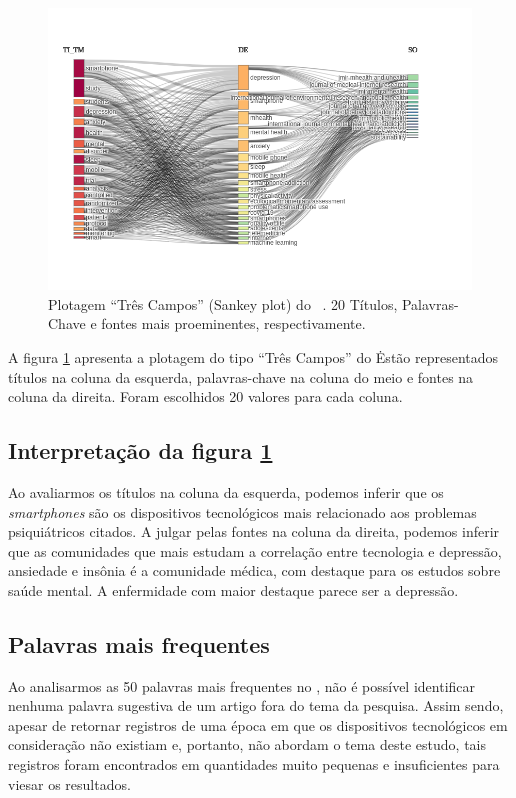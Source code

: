 \begin{figure}
    \centering
    \includegraphics[angle=0,width=1\textwidth]{experiments/GustavoMacCar/AnaliseBibliometrica/PsychDiseasesTech/sankey.png}
    \caption{Plotagem ``Três Campos'' (Sankey plot) do \dataset\ . 20 Títulos, Palavras-Chave e fontes mais proeminentes, respectivamente.}
    \label{fig:sankey:psych}
\end{figure}

A figura \ref{fig:sankey:psych} apresenta a plotagem do tipo ``Três Campos'' do \dataset\. Estão representados títulos na coluna da esquerda, palavras-chave na coluna do meio e fontes na coluna da direita. Foram escolhidos 20 valores para cada coluna.

\subsection{Interpretação da figura \ref{fig:sankey:psych}}
Ao avaliarmos os títulos na coluna da esquerda, podemos inferir que os \textit{smartphones} são os dispositivos tecnológicos mais relacionado aos problemas psiquiátricos citados. A julgar pelas fontes na coluna da direita, podemos inferir que as comunidades que mais 
estudam a correlação entre tecnologia e depressão, ansiedade e insônia é a comunidade médica, com destaque para os estudos sobre saúde mental. A enfermidade com maior destaque parece ser a depressão.

\subsection{Palavras mais frequentes}

Ao analisarmos as 50 palavras mais frequentes no \dataset, não é possível identificar nenhuma palavra sugestiva de um artigo fora do tema da pesquisa. Assim sendo, apesar de retornar registros de uma época em que os dispositivos tecnológicos em consideração não existiam e, portanto,
não abordam o tema deste estudo, tais registros foram encontrados em quantidades muito pequenas e insuficientes para viesar os resultados.

